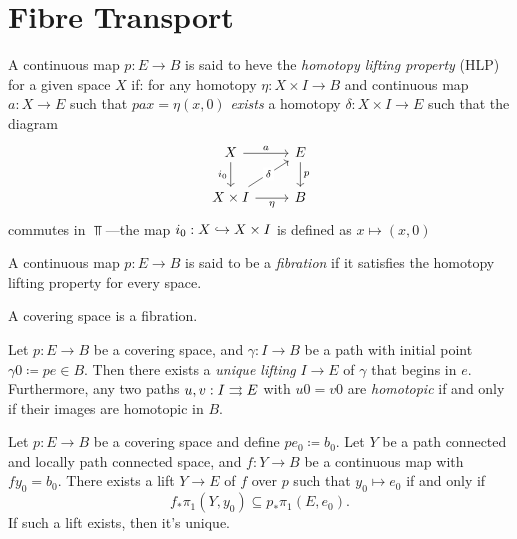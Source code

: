 \section{Fibre Transport}

\begin{definition}
\label{def:homotopy-lifting-property}
A continuous map \(p: E \to B\) is said to heve the \emph{homotopy lifting
  property} (HLP) for a given space \(X\) if: for any homotopy \(\eta: X \times
I \to B\) and continuous map \(a: X \to E\) such that \(p a x = \eta(x, 0)\)
\emph{exists} a homotopy \(\delta: X \times I \to E\) such that the diagram
\[
\begin{tikzcd}
X \ar[r, "a"] \ar[d, "i_0"']
&E \ar[d, "p"] \\
X \times I \ar[ru, "\delta" description]
\ar[r, "\eta"']
&B
\end{tikzcd}
\]
commutes in \(\Top\)---the map \(i_0: X \hookrightarrow X \times I\) is defined as
\(x \mapsto (x, 0)\)
\end{definition}


\begin{definition}[Fibration]
\label{def:fibration}
A continuous map \(p: E \to B\) is said to be a \emph{fibration} if it satisfies
the homotopy lifting property for every space.
\end{definition}

\begin{theorem}
\label{thm:coverings-are-fibrations}
A covering space is a fibration.
\end{theorem}


\begin{proposition}
\label{prop:path-lifting}
Let \(p: E \to B\) be a covering space, and \(\gamma: I \to B\) be a path with
initial point \(\gamma 0 \coloneq p e \in B\). Then there exists a \emph{unique
  lifting} \(I \to E\) of \(\gamma\) that begins in \(e\). Furthermore, any two
paths \(u, v: I \rightrightarrows E\) with \(u 0 = v 0\) are \emph{homotopic} if and only if
their images are homotopic in \(B\).
\end{proposition}

\begin{lemma}
\label{lem:general-lifting-lemma}
Let \(p: E \to B\) be a covering space and define \(p e_0 \coloneq b_0\). Let
\(Y\) be a path connected and locally path connected space, and \(f: Y \to B\)
be a continuous map with \(f y_0 = b_0\). There exists a lift \(Y \to E\) of
\(f\) over \(p\) such that \(y_0 \mapsto e_0\) if and only if
\[
f_{*} \pi_1(Y, y_0) \subseteq p_{*} \pi_1(E, e_0).
\]
If such a lift exists, then it's unique.
\end{lemma}

